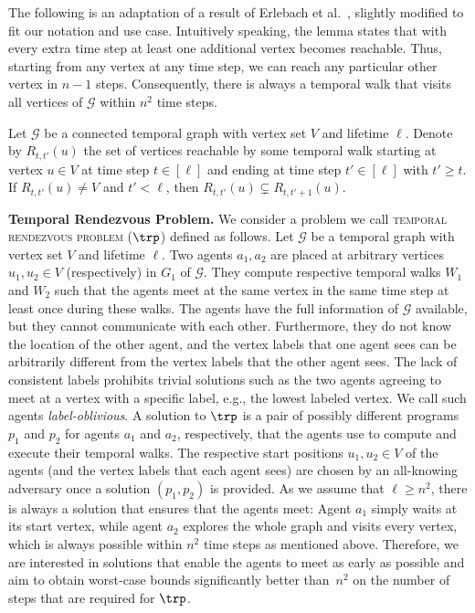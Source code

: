 The following is an adaptation of a result of Erlebach et
al.~\cite{ErlebachHK21}, slightly modified to fit our notation and use case.
Intuitively speaking, the lemma states that with every extra time step at least
one additional vertex becomes reachable. Thus, starting from any vertex at any
time step, we can reach any particular other vertex in $n-1$ steps.
Consequently, there is always a temporal walk that visits all vertices of
$\mathcal{G}$ within $n^2$ time steps. 

\begin{lemma}\label{lem:reachability} Let
    $\mathcal{G}$ be a connected temporal graph with vertex set $V$ and lifetime
    $\ell$. Denote by $R_{t, t'}(u)$ the set of vertices reachable by some
    temporal walk starting at vertex $u \in V$ at time step $t \in [\ell]$ and
    ending at time step $t' \in [\ell]$ with $t'\ge t$. If $R_{t,t'}(u)\neq V$
    and $t'<\ell$, then $R_{t,t'}(u) \subsetneq R_{t, t'+1}(u)$.
\end{lemma}



\noindent \textbf{Temporal Rendezvous Problem.} We consider a problem we call
\textsc{temporal rendezvous problem} ($\trp$) defined as follows. Let
$\mathcal{G}$ be a temporal graph with vertex set $V$ and lifetime $\ell$. Two
agents $a_1, a_2$ are placed at arbitrary vertices $u_1, u_2 \in V$
(respectively) in $G_1$ of $\mathcal{G}$. They compute respective temporal walks
$W_{1}$ and $W_{2}$ such that the agents meet at the same vertex in the same
time step at least once during these walks. The agents have the full information
of $\mathcal{G}$ available, but they cannot communicate with each other.
Furthermore, they do not know the location of the other agent, and the vertex
labels that one agent sees can be arbitrarily different from the vertex labels
that the other agent sees. The lack of consistent labels prohibits trivial
solutions such as the two agents agreeing to meet at a vertex with a specific
label, e.g., the lowest labeled vertex. We call such agents
\textit{label-oblivious}. A solution to $\trp$ is a pair of possibly different
programs $p_1$ and $p_2$ for agents $a_1$ and $a_2$, respectively, that the
agents use to compute and execute their temporal walks. The respective start
positions $u_1, u_2 \in V$ of the agents {(and the vertex labels that each
agent sees)} are chosen by an all-knowing adversary once a solution $(p_1, p_2)$
is provided. {As we assume that $\ell\ge n^2$, there is always a solution
that ensures that the agents meet: Agent $a_1$ simply waits at its start vertex,
while agent $a_2$ explores the whole graph and visits every vertex, which is
always possible within $n^2$ time steps as mentioned above. Therefore, we are
interested in solutions that enable the agents to meet as early as possible and
aim to obtain worst-case bounds significantly better than~$n^2$ on the number of
steps that are required for $\trp$.}

